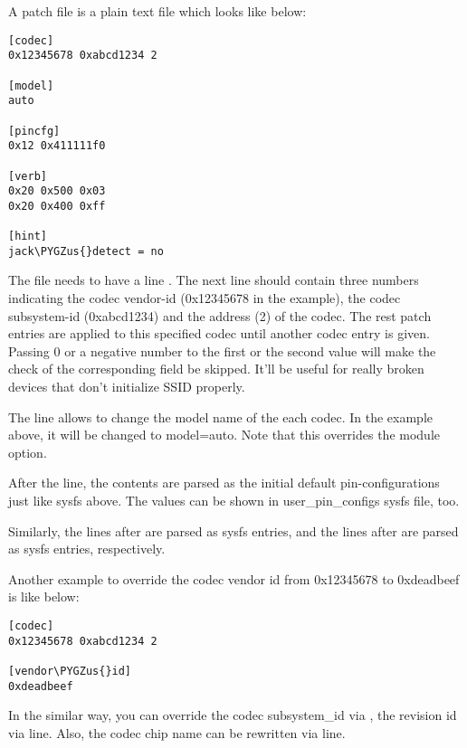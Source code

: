 \documentclass[a4paper,8pt,english]{sphinxmanual}
\def\PYGZus{\char`\_}
\begin{document}
A patch file is a plain text file which looks like below:

\begin{Verbatim}[commandchars=\\\{\}]
[codec]
0x12345678 0xabcd1234 2

[model]
auto

[pincfg]
0x12 0x411111f0

[verb]
0x20 0x500 0x03
0x20 0x400 0xff

[hint]
jack\PYGZus{}detect = no
\end{Verbatim}

The file needs to have a line \code{{[}codec{]}}.  The next line should contain
three numbers indicating the codec vendor-id (0x12345678 in the
example), the codec subsystem-id (0xabcd1234) and the address (2) of
the codec.  The rest patch entries are applied to this specified codec
until another codec entry is given.  Passing 0 or a negative number to
the first or the second value will make the check of the corresponding
field be skipped.  It'll be useful for really broken devices that don't
initialize SSID properly.

The \code{{[}model{]}} line allows to change the model name of the each codec.
In the example above, it will be changed to model=auto.
Note that this overrides the module option.

After the \code{{[}pincfg{]}} line, the contents are parsed as the initial
default pin-configurations just like  sysfs above.
The values can be shown in user\_pin\_configs sysfs file, too.

Similarly, the lines after \code{{[}verb{]}} are parsed as 
sysfs entries, and the lines after \code{{[}hint{]}} are parsed as 
sysfs entries, respectively.

Another example to override the codec vendor id from 0x12345678 to
0xdeadbeef is like below:

\begin{Verbatim}[commandchars=\\\{\}]
[codec]
0x12345678 0xabcd1234 2

[vendor\PYGZus{}id]
0xdeadbeef
\end{Verbatim}

In the similar way, you can override the codec subsystem\_id via
\code{{[}subsystem\_id{]}}, the revision id via \code{{[}revision\_id{]}} line.
Also, the codec chip name can be rewritten via  line.
\end{document}
